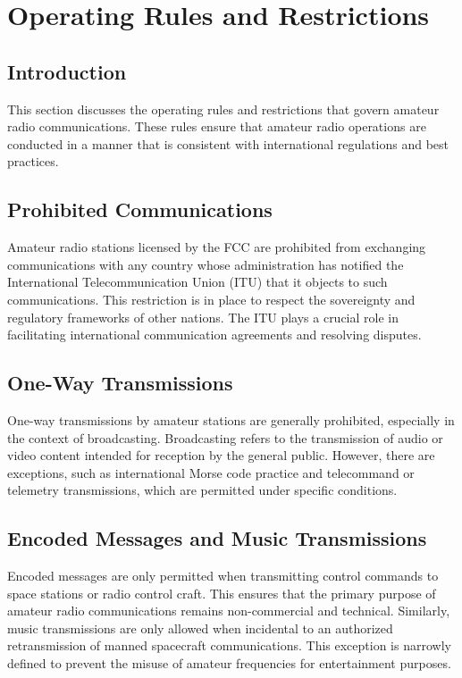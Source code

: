 \section{Operating Rules and Restrictions}
\label{sec:operating_rules}

\subsection*{Introduction}
This section discusses the operating rules and restrictions that govern amateur radio communications. These rules ensure that amateur radio operations are conducted in a manner that is consistent with international regulations and best practices.

\subsection*{Prohibited Communications}
Amateur radio stations licensed by the FCC are prohibited from exchanging communications with any country whose administration has notified the International Telecommunication Union (ITU) that it objects to such communications. This restriction is in place to respect the sovereignty and regulatory frameworks of other nations. The ITU plays a crucial role in facilitating international communication agreements and resolving disputes.

\subsection*{One-Way Transmissions}
One-way transmissions by amateur stations are generally prohibited, especially in the context of broadcasting. Broadcasting refers to the transmission of audio or video content intended for reception by the general public. However, there are exceptions, such as international Morse code practice and telecommand or telemetry transmissions, which are permitted under specific conditions.

\subsection*{Encoded Messages and Music Transmissions}
Encoded messages are only permitted when transmitting control commands to space stations or radio control craft. This ensures that the primary purpose of amateur radio communications remains non-commercial and technical. Similarly, music transmissions are only allowed when incidental to an authorized retransmission of manned spacecraft communications. This exception is narrowly defined to prevent the misuse of amateur frequencies for entertainment purposes.


